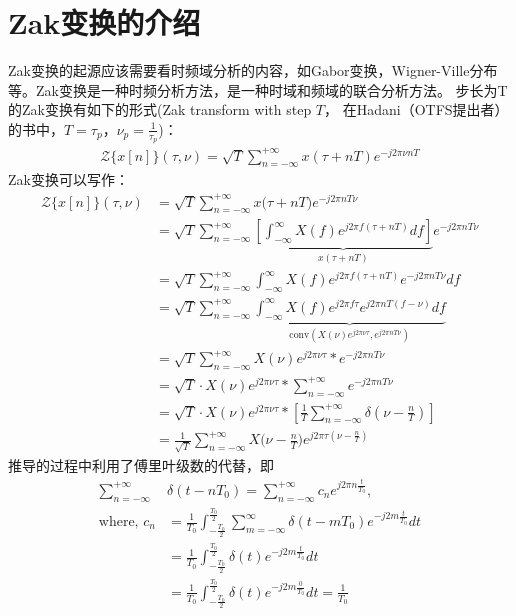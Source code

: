 \documentclass[12pt,a4paper]{article}%
\begin{document}
	\section{Zak变换的介绍}%
	Zak变换的起源应该需要看时频域分析的内容，如Gabor变换，Wigner-Ville分布等。Zak变换是一种时频分析方法，是一种时域和频域的联合分析方法。	步长为T的Zak变换有如下的形式(Zak transform with step $T$， 在Hadani（OTFS提出者）的书中，$T = \tau_p$，$\nu_p = \frac{1}{\tau_p}$)：
	\begin{equation}
		\label{eq1}
		\begin{aligned}
			\mathcal{Z}\{x[n]\}(\tau, \nu) = \sqrt{T} \sum_{n = -\infty}^{+\infty} x(\tau + nT)e^{-j2\pi \nu nT}
		\end{aligned}
	\end{equation}
	Zak变换可以写作：
	\begin{equation}
		\label{eq2}
		\begin{aligned}
			\mathcal{Z}\{x[n]\}(\tau, \nu) & =\sqrt{T}\sum_{n=-\infty}^{+\infty}x\Big(\tau+nT\Big)e^{-j2\pi nT\nu}  \\
			&=\sqrt{T}\sum_{n=-\infty}^{+\infty}\underbrace{\left[\int_{-\infty}^{\infty}X\left(f\right)e^{j2\pi f\left(\tau+nT\right)}df\right]}_{x\left(\tau+nT\right)}e^{-j2\pi nT\nu} \\
			&=\sqrt{T}\sum_{n=-\infty}^{+\infty}\int_{-\infty}^{\infty}X\left(f\right)e^{j2\pi f\left(\tau+nT\right)}e^{-j2\pi nT\nu}df \\
			&=\sqrt{T}\sum_{n=-\infty}^{+\infty}\underbrace{\int_{-\infty}^{\infty}X\left(f\right)e^{j2\pi f\tau}e^{j2\pi nT\left(f-\nu\right)}df}_{\mathrm{conv}\left(X(\nu)e^{j2\pi\nu\tau},e^{j2\pi nT\nu}\right)} \\
			&=\sqrt{T}\sum_{n=-\infty}^{+\infty}X(\nu)e^{j2\pi\nu\tau}*e^{-j2\pi nT\nu} \\
			&=\sqrt{T}\cdot X(\nu)e^{j2\pi\nu\tau}*\sum_{n=-\infty}^{+\infty}e^{-j2\pi nT\nu} \\
			&=\sqrt{T}\cdot X(\nu)e^{j2\pi\nu\tau}*\left[\frac{1}{T}\sum_{n=-\infty}^{+\infty}\delta\left(\nu-\frac{n}{T}\right)\right] \\
			&=\frac1{\sqrt T}\sum_{n=-\infty}^{+\infty}X\Big(\nu-\frac nT\Big)e^{j2\pi\tau(\nu-\frac nT)}
		\end{aligned}
	\end{equation}
	推导的过程中利用了傅里叶级数的代替，即
	\begin{equation}
		\label{eq3}
		\begin{aligned}
		\sum_{n=-\infty}^{+\infty}&\delta(t-nT_0)=\sum_{n=-\infty}^{+\infty}c_ne^{j2\pi n\frac{t}{T_0}},\\
		\textrm{where, }
		c_{n} & =\frac{1}{T_{0}}\int_{-\frac{T_{0}}{2}}^{\frac{T_{0}}{2}}\sum_{m=-\infty}^{\infty}\delta(t-mT_{0})e^{-j2m\frac{t}{T_{0}}}dt \\
		&=\frac{1}{T_{0}}\int_{-\frac{T_{0}}{2}}^{\frac{T_{0}}{2}}\delta(t)e^{-j2m\frac{t}{T_{0}}}dt \\
		&=\frac{1}{T_{0}}\int_{-\frac{T_{0}}{2}}^{\frac{T_{0}}{2}}\delta(t)e^{-j2m\frac{0}{T_{0}}}dt=\frac{1}{T_{0}}
		\end{aligned}
	\end{equation}
\end{document}
